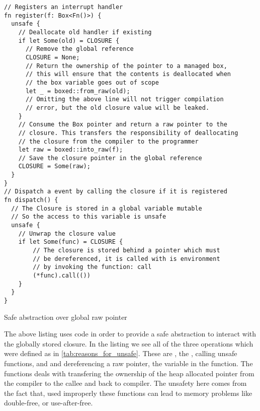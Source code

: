 \begin{listing}[H]
  \begin{verbatim}
// Registers an interrupt handler
fn register(f: Box<Fn()>) {
  unsafe {
    // Deallocate old handler if existing
    if let Some(old) = CLOSURE {
      // Remove the global reference
      CLOSURE = None;
      // Return the ownership of the pointer to a managed box,
      // this will ensure that the contents is deallocated when
      // the box variable goes out of scope
      let _ = boxed::from_raw(old);
      // Omitting the above line will not trigger compilation
      // error, but the old closure value will be leaked.
    }
    // Consume the Box pointer and return a raw pointer to the
    // closure. This transfers the responsibility of deallocating
    // the closure from the compiler to the programmer
    let raw = boxed::into_raw(f);
    // Save the closure pointer in the global reference
    CLOSURE = Some(raw);
  }
}
// Dispatch a event by calling the closure if it is registered
fn dispatch() {
  // The Closure is stored in a global variable mutable
  // So the access to this variable is unsafe
  unsafe {
    // Unwrap the closure value
    if let Some(func) = CLOSURE {
        // The closure is stored behind a pointer which must
        // be dereferenced, it is called with is environment
        // by invoking the function: call
        (*func).call(())
    }
  }
}
  \end{verbatim}
  \caption{Safe abstraction over global raw pointer}
  \label{lst:reg-disp}
\end{listing}

The above listing uses {\unsafe} code in order to provide a safe abstraction to interact with the globally stored closure.
In the listing we see all of the three operations which were defined as {\unsafe} in \autoref{tab:reasons_for_unsafe}.
These are , the , calling unsafe functions,  and  and dereferencing a raw pointer, the  variable in the  function.
The {\unsafe} functions deals with transfering the ownership of the heap allocated pointer from the compiler to the callee and back to compiler.
The unsafety here comes from the fact that, used improperly these functions can lead to memory problems like double-free, or use-after-free.


